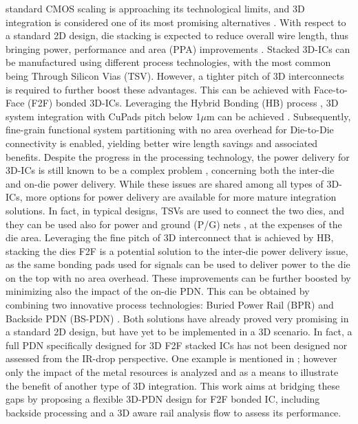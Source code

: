 \documentclass[../TCASII_jrnl.tex]{subfiles}
\begin{document}
standard CMOS scaling is approaching its technological limits, and 3D integration is considered one of its most
promising alternatives \cite{mybib:beyne20063d}. With respect to a standard 2D design, die stacking is expected to reduce
overall wire length, thus bringing power, performance and area (PPA) improvements \cite{mybib:black2006stacking}. Stacked
3D-ICs can be manufactured using different process technologies, with the most common being Through Silicon Vias (TSV).
However, a tighter pitch of 3D interconnects is required to further boost these advantages. This can be achieved with
Face-to-Face (F2F) bonded 3D-ICs. Leveraging the Hybrid Bonding (HB) process \cite{mybib:katti20093d}, 3D system
integration with CuPads pitch below 1$\mu$m can be achieved \cite{mybib:HBref}. Subsequently, fine-grain
functional system partitioning with no area overhead for Die-to-Die connectivity is enabled, yielding better wire length
savings and associated benefits. Despite the progress in the processing technology, the power delivery for 3D-ICs is
still known to be a complex problem \cite{mybib:deliveryref1}, concerning both the inter-die and on-die power
delivery. While these issues are shared among all types of 3D-ICs, more options for power delivery are available for
more mature integration solutions. In fact, in typical designs, TSVs are used to connect the two dies, and they can be
used also for power and ground (P/G) nets \cite{mybib:TSVref2}, at the expenses of the die area. Leveraging the
fine pitch of 3D interconnect that is achieved by HB, stacking the dies F2F is a potential solution to the inter-die
power delivery issue, as the same bonding pads used for signals can be used to deliver power to the die on the top with
no area overhead. These improvements can be further boosted by minimizing also the impact of the on-die PDN. This can be
obtained by combining two innovative process technologies: Buried Power Rail (BPR) and Backside PDN (BS-PDN)
\cite{mybib:bprref}\cite{mybib:backsidePDN}. Both solutions have already proved very promising in a standard
2D design, but have yet to be implemented in a 3D scenario. In fact, a full PDN specifically designed for 3D F2F stacked
ICs has not been designed nor assessed from the IR-drop perspective. One example is mentioned in
\cite{mybib:monolithic}; however only the impact of the metal resources is analyzed and as a means to illustrate
the benefit of another type of 3D integration. This work aims at bridging these gaps by proposing a flexible 3D-PDN
design for F2F bonded IC, including backside processing and a 3D aware rail analysis flow to assess its performance.
\end{document}
